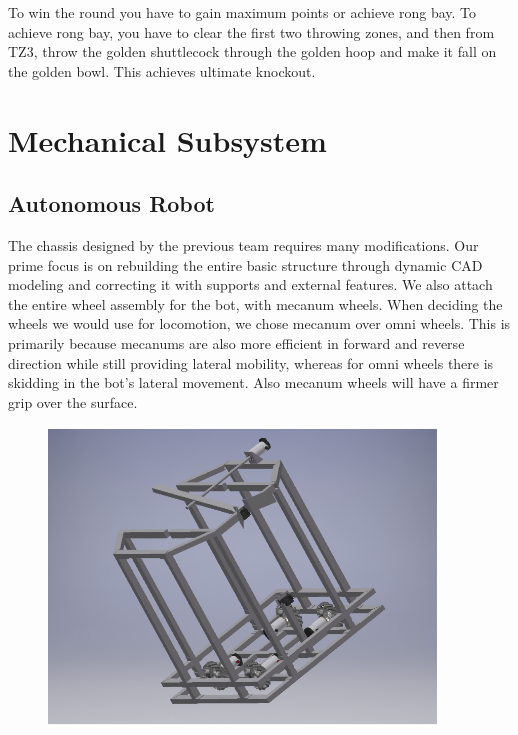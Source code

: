 \documentclass[11pt]{article}
\begin{document}
To win the round you have to gain maximum points or achieve rong bay.
To achieve rong bay, you have to clear the first two throwing zones, and then from TZ3, throw the golden shuttlecock through the golden hoop and make it fall on the golden bowl. This achieves ultimate knockout.

\pagebreak


\pagebreak

\section{Mechanical Subsystem}
\subsection{Autonomous Robot}
The chassis designed by the previous team requires many modifications. Our prime focus is on rebuilding the entire basic structure through dynamic CAD modeling and correcting it with supports and external features.
We also attach the entire wheel assembly for the bot, with mecanum wheels. When deciding the wheels we would use for locomotion, we chose mecanum over omni wheels. This is primarily because mecanums are also more efficient in forward and reverse direction while still providing lateral mobility, whereas for omni wheels there is skidding in the bot's lateral movement. Also mecanum wheels will have a firmer grip over the surface.

\begin{figure}[!htb]
\centering
\includegraphics[scale=0.7]{chassis.png}
\end{figure}
\end{document}
